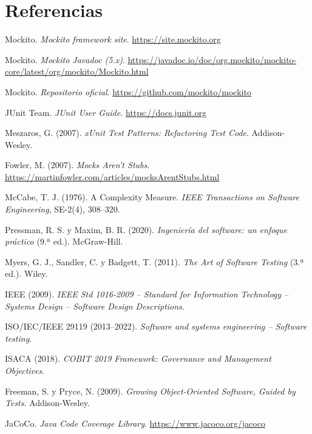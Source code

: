 \documentclass[11pt,a4paper,oneside]{report}
\begin{document}
\chapter*{Referencias}
\begin{enumerate}[label={[\arabic*]}]
  \item Mockito. \emph{Mockito framework site}. \url{https://site.mockito.org}
  \item Mockito. \emph{Mockito Javadoc (5.x)}. \url{https://javadoc.io/doc/org.mockito/mockito-core/latest/org/mockito/Mockito.html}
  \item Mockito. \emph{Repositorio oficial}. \url{https://github.com/mockito/mockito}
  \item JUnit Team. \emph{JUnit User Guide}. \url{https://docs.junit.org}
  \item Meszaros, G. (2007). \emph{xUnit Test Patterns: Refactoring Test Code}. Addison-Wesley.
  \item Fowler, M. (2007). \emph{Mocks Aren't Stubs}. \url{https://martinfowler.com/articles/mocksArentStubs.html}
  \item McCabe, T. J. (1976). A Complexity Measure. \emph{IEEE Transactions on Software Engineering}, SE-2(4), 308--320.
  \item Pressman, R. S. y Maxim, B. R. (2020). \emph{Ingeniería del software: un enfoque práctico} (9.ª ed.). McGraw-Hill.
  \item Myers, G. J., Sandler, C. y Badgett, T. (2011). \emph{The Art of Software Testing} (3.ª ed.). Wiley.
  \item IEEE (2009). \emph{IEEE Std 1016-2009 -- Standard for Information Technology -- Systems Design -- Software Design Descriptions}.
  \item ISO/IEC/IEEE 29119 (2013--2022). \emph{Software and systems engineering -- Software testing}.
  \item ISACA (2018). \emph{COBIT 2019 Framework: Governance and Management Objectives}.
  \item Freeman, S. y Pryce, N. (2009). \emph{Growing Object-Oriented Software, Guided by Tests}. Addison-Wesley.
  \item JaCoCo. \emph{Java Code Coverage Library}. \url{https://www.jacoco.org/jacoco}
\end{enumerate}

\appendix
\end{document}
